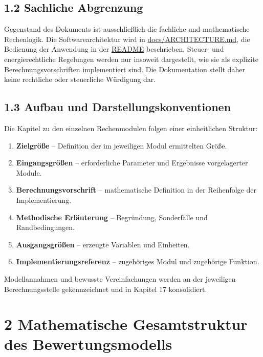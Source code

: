 \documentclass[
  a4paper,
  10pt]{article}
\providecommand{\tightlist}{%
  \setlength{\itemsep}{0pt}\setlength{\parskip}{0pt}}
\renewenvironment{quote}
  {\begin{tcolorbox}[
      enhanced,
      breakable,
      colback=Wash,
      colframe=Brand,
      boxrule=0pt,
      leftrule=2.2pt,
      arc=0pt,
      left=8pt,right=8pt,top=6pt,bottom=6pt,
      before skip=8pt,after skip=9pt
    ]\small\color{InkSoft}}
  {\end{tcolorbox}}
\begin{document}
\hypertarget{sachliche-abgrenzung}{%
\subsection{1.2 Sachliche Abgrenzung}\label{sachliche-abgrenzung}}

Gegenstand des Dokuments ist ausschließlich die fachliche und
mathematische Rechenlogik. Die Softwarearchitektur wird in
\href{../ARCHITECTURE.md}{docs/ARCHITECTURE.md}, die Bedienung der
Anwendung in der \href{../../README.md}{README} beschrieben. Steuer- und
energierechtliche Regelungen werden nur insoweit dargestellt, wie sie
als explizite Berechnungsvorschriften implementiert sind. Die
Dokumentation stellt daher keine rechtliche oder steuerliche Würdigung
dar.

\hypertarget{aufbau-und-darstellungskonventionen}{%
\subsection{1.3 Aufbau und
Darstellungskonventionen}\label{aufbau-und-darstellungskonventionen}}

Die Kapitel zu den einzelnen Rechenmodulen folgen einer einheitlichen
Struktur:

\begin{enumerate}
\def\labelenumi{\arabic{enumi}.}
\tightlist
\item
  \textbf{Zielgröße} -- Definition der im jeweiligen Modul ermittelten
  Größe.
\item
  \textbf{Eingangsgrößen} -- erforderliche Parameter und Ergebnisse
  vorgelagerter Module.
\item
  \textbf{Berechnungsvorschrift} -- mathematische Definition in der
  Reihenfolge der Implementierung.
\item
  \textbf{Methodische Erläuterung} -- Begründung, Sonderfälle und
  Randbedingungen.
\item
  \textbf{Ausgangsgrößen} -- erzeugte Variablen und Einheiten.
\item
  \textbf{Implementierungsreferenz} -- zugehöriges Modul und zugehörige
  Funktion.
\end{enumerate}

\begin{quote}
Modellannahmen und bewusste Vereinfachungen werden an der jeweiligen
Berechnungsstelle gekennzeichnet und in Kapitel 17 konsolidiert.
\end{quote}

\hypertarget{mathematische-gesamtstruktur-des-bewertungsmodells}{%
\section{2 Mathematische Gesamtstruktur des
Bewertungsmodells}\label{mathematische-gesamtstruktur-des-bewertungsmodells}}
\end{document}
